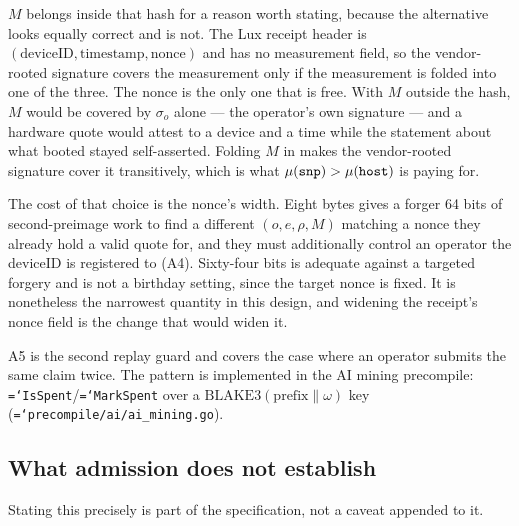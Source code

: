 \documentclass[11pt,a4paper]{article}
\newcommand{\code}[1]{\texttt{\hyphenchar\font=`\-\relax #1}}
\begin{document}
$M$ belongs inside that hash for a reason worth stating, because the alternative
looks equally correct and is not. The Lux receipt header is
$(\text{deviceID}, \text{timestamp}, \text{nonce})$ and has no measurement field,
so the vendor-rooted signature covers the measurement only if the measurement is
folded into one of the three. The nonce is the only one that is free. With $M$
outside the hash, $M$ would be covered by $\sigma_o$ alone --- the operator's own
signature --- and a hardware quote would attest to a device and a time while the
statement about what booted stayed self-asserted. Folding $M$ in makes the
vendor-rooted signature cover it transitively, which is what
$\mu(\code{snp}) > \mu(\code{host})$ is paying for.

The cost of that choice is the nonce's width. Eight bytes gives a forger 64 bits
of second-preimage work to find a different $(o, e, \rho, M)$ matching a nonce
they already hold a valid quote for, and they must additionally control an
operator the deviceID is registered to (A4). Sixty-four bits is adequate against
a targeted forgery and is not a birthday setting, since the target nonce is
fixed. It is nonetheless the narrowest quantity in this design, and widening the
receipt's nonce field is the change that would widen it.

A5 is the second replay guard and covers the case where an operator submits the
same claim twice. The pattern is implemented in the AI mining precompile:
\code{IsSpent}/\code{MarkSpent} over a
$\mathrm{BLAKE3}(\text{prefix} \| \omega)$ key
(\code{precompile/ai/ai\_mining.go}).

\subsection{What admission does not establish}

Stating this precisely is part of the specification, not a caveat appended to it.
\end{document}
